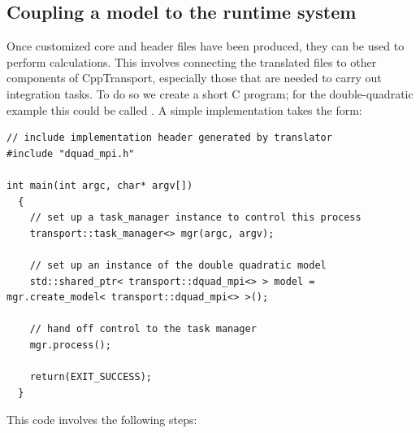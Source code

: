 \documentclass[11pt,a4paper]{article}
\renewcommand{\texttt}[1]{{\ttfamily\fontseries{l}\selectfont{#1}}}
\newcommand{\packagefont}{\sffamily}
\newcommand{\CppTransport}{{\packagefont CppTransport}}
\newcommand{\file}[1]{\texttt{{#1}}}
\newcommand\CC{C\nolinebreak\hspace{-.05em}\raisebox{.4ex}{\relsize{-3}{\textbf{+}}}\nolinebreak\hspace{-.10em}\raisebox{.4ex}{\relsize{-3}{\textbf{+}}}}
\begin{document}
\subsection{Coupling a model to the runtime system}
\label{sec:couple-to-runtime}
Once customized core and header files
have been produced, they can be used to perform
calculations. This involves
connecting the translated
files to other components of
{\CppTransport},
especially those that are needed to carry out integration tasks.
To do so we create a short {\CC} program;
for the double-quadratic example this could be called
\file{dquad.cpp}.
A simple implementation takes the form:
\begin{verbatim}
// include implementation header generated by translator
#include "dquad_mpi.h"

int main(int argc, char* argv[])
  {
    // set up a task_manager instance to control this process
    transport::task_manager<> mgr(argc, argv);

    // set up an instance of the double quadratic model
    std::shared_ptr< transport::dquad_mpi<> > model = mgr.create_model< transport::dquad_mpi<> >();

    // hand off control to the task manager
    mgr.process();

    return(EXIT_SUCCESS);
  }
\end{verbatim}
This code involves the following steps:
\end{document}

